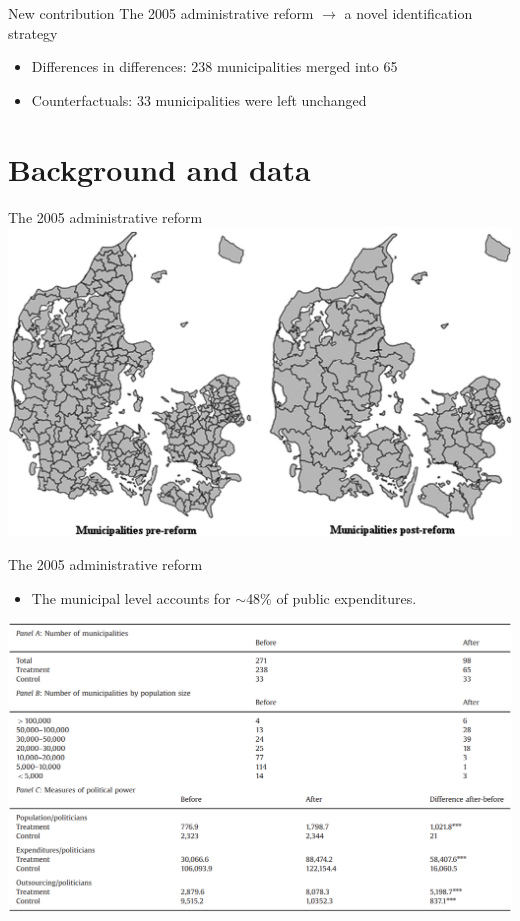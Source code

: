 \documentclass[8pt]{beamer}
\begin{document}
\begin{frame}{ New contribution}
  The 2005 administrative reform $\rightarrow$ a novel identification strategy
  \begin{itemize}
      \item Differences in differences: 238 municipalities merged into 65
      \item Counterfactuals: 33 municipalities were left unchanged
  \end{itemize}
\end{frame}


\section{Background and data}


\begin{frame}{The 2005 administrative reform}
  \includegraphics[width= \textwidth]{municipalities.PNG}
\end{frame}


\begin{frame}{The 2005 administrative reform}
  \begin{itemize}
    \item The municipal level accounts for $\sim$48\% of public expenditures.
  \end{itemize}
  \includegraphics[width= \textwidth]{table1.PNG}
\end{frame}
\end{document}

